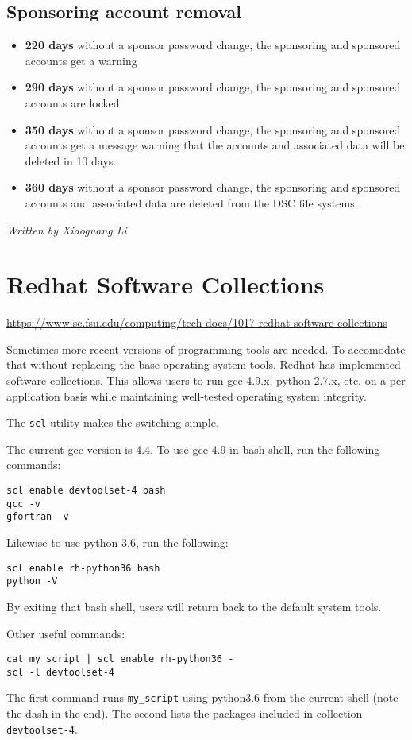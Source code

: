 \documentclass[12pt,a4paper]{article}
\begin{document}
\subsection*{Sponsoring account removal}
\begin{itemize}
    \item \textbf{220 days} without a sponsor password change, the sponsoring and sponsored accounts get a warning
    \item \textbf{290 days} without a sponsor password change, the sponsoring and sponsored accounts are locked
    \item \textbf{350 days} without a sponsor password change, the sponsoring and sponsored accounts get a message warning that the accounts and associated data will be deleted in 10 days.
    \item \textbf{360 days} without a sponsor password change, the sponsoring and sponsored accounts and associated data are deleted from the DSC file systems.
\end{itemize}
\hfill \textit{Written by Xiaoguang Li}

\section{Redhat Software Collections}
\url{https://www.sc.fsu.edu/computing/tech-docs/1017-redhat-software-collections}

Sometimes more recent versions of programming tools are needed. To accomodate that without replacing the base operating system tools, Redhat has implemented software collections. This allows users to run gcc 4.9.x, python 2.7.x, etc. on a per application basis while maintaining well-tested operating system integrity.

The \texttt{scl} utility makes the switching simple.

The current gcc version is 4.4. To use gcc 4.9 in bash shell, run the following commands:
\begin{verbatim}
scl enable devtoolset-4 bash
gcc -v
gfortran -v
\end{verbatim}
Likewise to use python 3.6, run the following:
\begin{verbatim}
scl enable rh-python36 bash
python -V
\end{verbatim}
By exiting that bash shell, users will return back to the default system tools.

Other useful commands:
\begin{verbatim}
cat my_script | scl enable rh-python36 -
scl -l devtoolset-4
\end{verbatim}
The first command runs \texttt{my\_script} using python3.6 from the current shell (note the dash in the end). The second lists the packages included in collection \texttt{devtoolset-4}.
\end{document}
